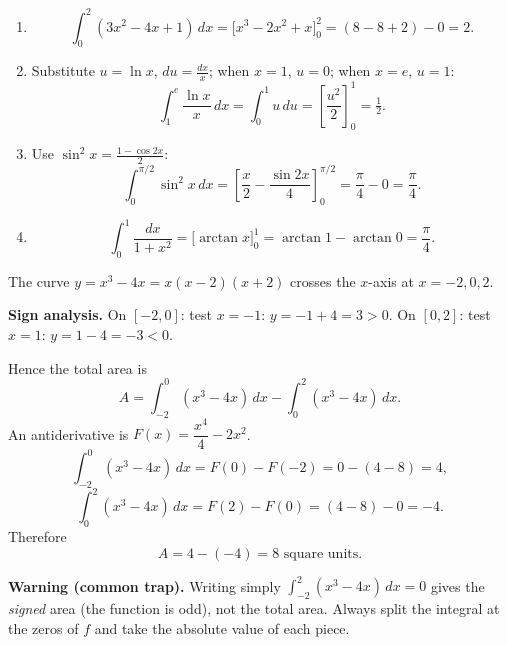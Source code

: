 \documentclass[11pt]{article}
\begin{document}
\begin{corrige}
\begin{enumerate}
\item
\[
\int_0^2 (3x^2-4x+1)\,dx = \Big[x^3 - 2x^2 + x\Big]_0^2 = (8 - 8 + 2) - 0 = \boxed{2}.
\]
\item Substitute $u = \ln x$, $du = \frac{dx}{x}$; when $x=1$, $u=0$; when $x=e$, $u=1$:
\[
\int_1^e \frac{\ln x}{x}\,dx = \int_0^1 u\,du = \left[\frac{u^2}{2}\right]_0^1 = \boxed{\tfrac12}.
\]
\item Use $\sin^2 x = \frac{1-\cos 2x}{2}$:
\[
\int_0^{\pi/2}\sin^2 x\,dx = \left[\frac{x}{2} - \frac{\sin 2x}{4}\right]_0^{\pi/2} = \frac{\pi}{4} - 0 = \boxed{\frac{\pi}{4}}.
\]
\item
\[
\int_0^1 \frac{dx}{1+x^2} = \Big[\arctan x\Big]_0^1 = \arctan 1 - \arctan 0 = \boxed{\frac{\pi}{4}}.
\]
\end{enumerate}
\end{corrige}

\begin{corrige}
The curve $y = x^3 - 4x = x(x-2)(x+2)$ crosses the $x$-axis at $x = -2, 0, 2$.

\textbf{Sign analysis.} On $[-2,0]$: test $x=-1$: $y = -1+4 = 3 > 0$. On $[0,2]$: test $x=1$: $y = 1 - 4 = -3 < 0$.

Hence the total area is
\[
A = \int_{-2}^{0}(x^3-4x)\,dx - \int_{0}^{2}(x^3-4x)\,dx .
\]
An antiderivative is $F(x) = \dfrac{x^4}{4} - 2x^2$.
\[
\int_{-2}^{0}(x^3-4x)\,dx = F(0) - F(-2) = 0 - (4 - 8) = 4,
\]
\[
\int_{0}^{2}(x^3-4x)\,dx = F(2) - F(0) = (4-8) - 0 = -4.
\]
Therefore
\[
A = 4 - (-4) = \boxed{8 \text{ square units}}.
\]

\textbf{Warning (common trap).} Writing simply $\int_{-2}^{2}(x^3-4x)\,dx = 0$ gives the \emph{signed} area (the function is odd), not the total area. Always split the integral at the zeros of $f$ and take the absolute value of each piece.
\end{corrige}
\end{document}
